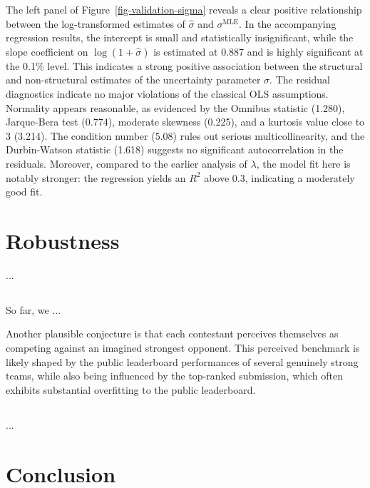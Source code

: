 \documentclass[mnsc]{informs3}
\begin{document}
The left panel of Figure~\ref{fig-validation-sigma} reveals a clear positive relationship between the log-transformed estimates of $\hat{\sigma}$ and $\sigma^{\text{MLE}}$. 
In the accompanying regression results, the intercept is small and statistically insignificant, while the slope coefficient on $\log(1 + \hat{\sigma})$ is estimated at 0.887 and is highly significant at the 0.1\% level. 
This indicates a strong positive association between the structural and non-structural estimates of the uncertainty parameter $\sigma$.
The residual diagnostics indicate no major violations of the classical OLS assumptions. 
Normality appears reasonable, as evidenced by the Omnibus statistic (1.280), Jarque-Bera test (0.774), moderate skewness (0.225), and a kurtosis value close to 3 (3.214). 
The condition number (5.08) rules out serious multicollinearity, and the Durbin-Watson statistic (1.618) suggests no significant autocorrelation in the residuals.
Moreover, compared to the earlier analysis of $\lambda$, the model fit here is notably stronger: the regression yields an $R^2$ above 0.3, indicating a moderately good fit. 


\section{Robustness}

...

\subsection{}\label{sect-robust-2players}

So far, we ...

Another plausible conjecture is that each contestant perceives themselves as competing against an imagined strongest opponent. 
This perceived benchmark is likely shaped by the public leaderboard performances of several genuinely strong teams, while also being influenced by the top-ranked submission, which often exhibits substantial overfitting to the public leaderboard.

\subsection{}\label{sect-robust-normality}

...

\section{Conclusion}
\end{document}
